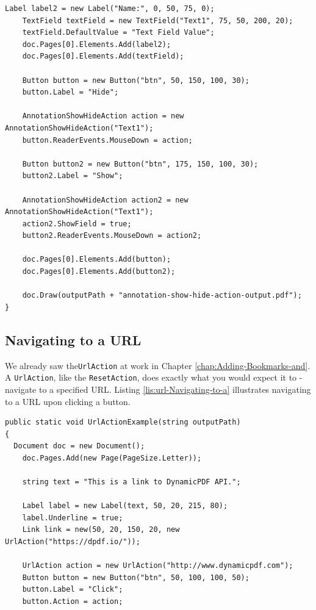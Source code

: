 \documentclass[american]{tufte-book}
\numberwithin{equation}{section}
\numberwithin{figure}{section}
\begin{document}
{{\begin{lstlisting}[caption={Hiding and showing a form field.},label={lis:Hiding-and-showing},basicstyle={\footnotesize\ttfamily},breaklines=true]
    Label label2 = new Label("Name:", 0, 50, 75, 0);
    TextField textField = new TextField("Text1", 75, 50, 200, 20);
    textField.DefaultValue = "Text Field Value";
    doc.Pages[0].Elements.Add(label2);
    doc.Pages[0].Elements.Add(textField);

    Button button = new Button("btn", 50, 150, 100, 30);
    button.Label = "Hide";
          
    AnnotationShowHideAction action = new AnnotationShowHideAction("Text1");
    button.ReaderEvents.MouseDown = action;

    Button button2 = new Button("btn", 175, 150, 100, 30);
    button2.Label = "Show";

    AnnotationShowHideAction action2 = new AnnotationShowHideAction("Text1");
    action2.ShowField = true;
    button2.ReaderEvents.MouseDown = action2;

    doc.Pages[0].Elements.Add(button);
    doc.Pages[0].Elements.Add(button2);

    doc.Draw(outputPath + "annotation-show-hide-action-output.pdf");
}
\end{lstlisting}
\leavevmode\egroup


\subsection{Navigating to a URL}

We already saw the\texttt{UrlAction} at work in Chapter
\ref{chap:Adding-Bookmarks-and}. A \texttt{UrlAction},
like the \texttt{ResetAction}, does exactly what you
would expect it to - navigate to a specified URL. Listing \ref{lis:url-Navigating-to-a}
illustrates navigating to a URL upon clicking a button.

\bgroup{}
\begin{lstlisting}[caption={Navigating to a URL using UrlAction.},label={lis:url-Navigating-to-a},basicstyle={\footnotesize\ttfamily},breaklines=true]
public static void UrlActionExample(string outputPath)
{
  Document doc = new Document();
    doc.Pages.Add(new Page(PageSize.Letter));

    string text = "This is a link to DynamicPDF API.";

    Label label = new Label(text, 50, 20, 215, 80);
    label.Underline = true;
    Link link = new(50, 20, 150, 20, new UrlAction("https://dpdf.io/"));

    UrlAction action = new UrlAction("http://www.dynamicpdf.com");
    Button button = new Button("btn", 50, 100, 100, 50);
    button.Label = "Click";
    button.Action = action;


\end{lstlisting}}}
\end{document}
